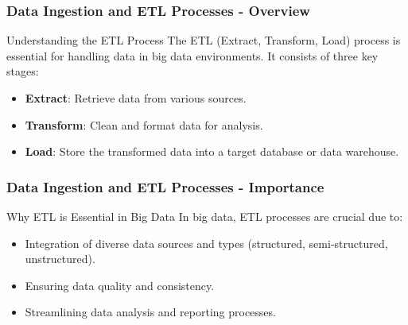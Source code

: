 \documentclass[aspectratio=169]{beamer}
\begin{document}
\begin{frame}[fragile]
    \frametitle{Data Ingestion and ETL Processes - Overview}
    \begin{block}{Understanding the ETL Process}
        The ETL (Extract, Transform, Load) process is essential for handling data in big data environments. It consists of three key stages:
    \end{block}
    \begin{itemize}
        \item \textbf{Extract}: Retrieve data from various sources.
        \item \textbf{Transform}: Clean and format data for analysis.
        \item \textbf{Load}: Store the transformed data into a target database or data warehouse.
    \end{itemize}
\end{frame}

\begin{frame}[fragile]
    \frametitle{Data Ingestion and ETL Processes - Importance}
    \begin{block}{Why ETL is Essential in Big Data}
        In big data, ETL processes are crucial due to:
    \end{block}
    \begin{itemize}
        \item Integration of diverse data sources and types (structured, semi-structured, unstructured).
        \item Ensuring data quality and consistency.
        \item Streamlining data analysis and reporting processes.
    \end{itemize}
\end{frame}
\end{document}
